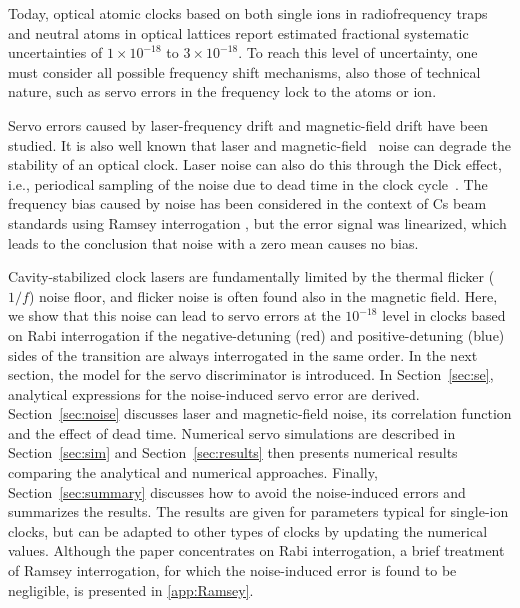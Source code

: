 \documentclass[10pt,a4paper]{iopart}
\begin{document}
Today, optical atomic clocks based on both single ions in radiofrequency traps \cite{Brewer2019a,Sanner2019a} and neutral atoms in optical lattices \cite{McGrew2018a,Bothwell2019a} report estimated fractional systematic uncertainties of $1\times 10^{-18}$ to $3\times 10^{-18}$.
To reach this level of uncertainty, one must consider all possible frequency shift mechanisms,
also those of technical nature, such as servo errors in the frequency lock to the atoms or ion.

Servo errors caused by laser-frequency drift \cite{Peik2006a,Falke2011a,Dube2018a,Yuan2021a} and magnetic-field drift \cite{Barwood2015a,King2022a,Steinel2022a} have been studied. It is also well known that laser \cite{Leroux2017a} and magnetic-field~\cite{Barwood2015a} noise can degrade the stability of an optical clock. Laser noise can also do this through the Dick effect, i.e., periodical sampling of the noise due to dead time in the clock cycle~\cite{Dick1987a,Santarelli1998a}.
The frequency bias caused by noise has been considered in the context of Cs beam standards using Ramsey interrogation \cite{Shirley2001a}, but the error signal was linearized, which leads to the conclusion that noise with a zero mean causes no bias.

Cavity-stabilized clock lasers are fundamentally limited by the thermal flicker ($1/f$) noise floor, and flicker noise is often found also in the magnetic field. Here, we show that this noise can lead to servo errors at the $10^{-18}$ level in clocks based on Rabi interrogation if the negative-detuning (red) and positive-detuning (blue) sides of the transition are always interrogated in the same order.
In the next section, the model for the servo discriminator is introduced.
In Section~\ref{sec:se}, analytical expressions for the noise-induced servo error are derived. Section~\ref{sec:noise} discusses laser and magnetic-field noise, its correlation function and the effect of dead time. Numerical servo simulations are described in Section~\ref{sec:sim} and Section~\ref{sec:results} then presents numerical results comparing the analytical and numerical approaches. Finally, Section~\ref{sec:summary} discusses how to avoid the noise-induced errors and summarizes the results.
The results are given for parameters typical for single-ion clocks, but can be adapted to other types of clocks by updating the numerical values.
Although the paper concentrates on Rabi interrogation, a brief treatment of Ramsey interrogation, for which the noise-induced error is found to be negligible, is presented in \ref{app:Ramsey}.
\end{document}
